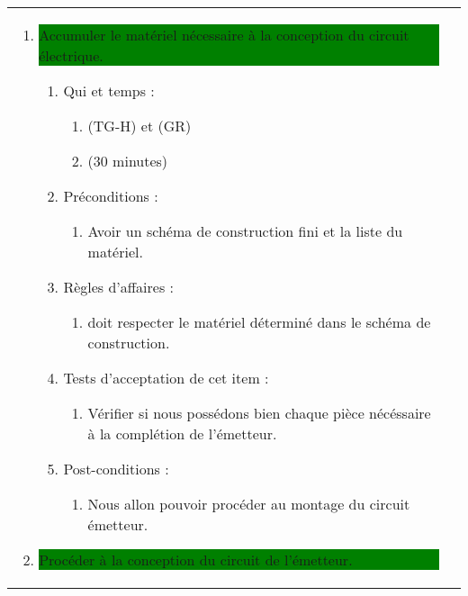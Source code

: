 \begin{longtable}{|l|p{}|}
\begin{enumerate}[label*=\arabic*.]
\begin{enumerate}[label*=\arabic*.]
\begin{enumerate}[label*=\arabic*.]
                    \end{enumerate}
                \end{enumerate}
            \item \colorbox{Green}{\parbox{13cm}{Accumuler le matériel nécessaire à la conception du circuit électrique.}}
            \begin{enumerate}[label*=\arabic*.]
                    \item Qui et temps :
                    \begin{enumerate}[label*=\arabic*.]
                        \item (TG-H) et (GR)
                        \item (30 minutes)
                    \end{enumerate}
                    \item Préconditions :
                    \begin{enumerate}[label*=\arabic*.]
                        \item Avoir un schéma de construction fini et la liste du matériel.
                    \end{enumerate}
                    \item Règles d’affaires :
                    \begin{enumerate}[label*=\arabic*.]
                        \item doit respecter le matériel déterminé dans le schéma de construction.
                    \end{enumerate}
                    \item Tests d'acceptation de cet item :
                    \begin{enumerate}[label*=\arabic*.]
                        \item Vérifier si nous possédons bien chaque pièce nécéssaire à la complétion de l'émetteur.
                    \end{enumerate}
                    \item Post-conditions :
                    \begin{enumerate}[label*=\arabic*.]
                        \item Nous allon pouvoir procéder au montage du circuit émetteur.
                    \end{enumerate}
                \end{enumerate}
            \item \colorbox{Green}{\parbox{13cm}{Procéder à la conception du circuit de l’émetteur.}}

\end{enumerate}
\end{longtable}
